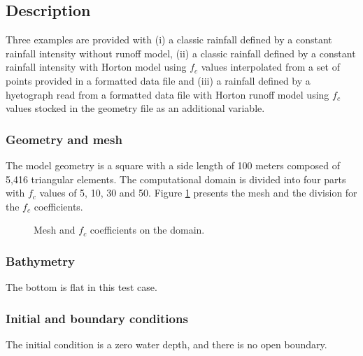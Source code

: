 \subsection{Description}

Three examples are provided with
(i) a classic rainfall defined by a constant rainfall intensity without runoff model,
(ii) a classic rainfall defined by a constant rainfall intensity with Horton
model using $f_c$ values interpolated from a set of points provided in a
formatted data file and
(iii) a rainfall defined by a hyetograph read from a formatted data file with
Horton runoff model using $f_c$ values stocked in the geometry file as an
additional variable.

\subsubsection{Geometry and mesh}

The model geometry is a square with a side length of 100 meters composed of
5,416 triangular elements.
The computational domain is divided into four parts with $f_c$ values of 5, 10,
30 and 50.
Figure \ref{pluiehorton:fig:mesh:fc} presents the mesh and the division for the
$f_c$ coefficients.

\begin{figure}[H]
\begin{minipage}[t]{0.5\textwidth}
 \centering
\end{minipage}%
\begin{minipage}[t]{0.5\textwidth}
 \centering
\end{minipage}
 \caption{Mesh and $f_c$ coefficients on the domain.}
 \label{pluiehorton:fig:mesh:fc}
\end{figure}

\subsubsection{Bathymetry}

The bottom is flat in this test case.

\subsubsection{Initial and boundary conditions}

The initial condition is a zero water depth, and there is no open boundary.

